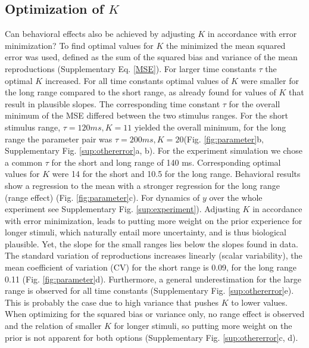 \documentclass[10pt]{article}
\begin{document}
\subsection{Optimization of $K$}
Can behavioral effects also be achieved by adjusting $K$ in accordance with error minimization?
To find optimal values for $K$ the minimized the mean squared error was used, defined as the sum of the squared bias and variance of the mean reproductions (Supplementary Eq. \ref{MSE}).
For larger time constants $\tau$ the optimal $K$ increased. For all time constants optimal values of $K$ were smaller for the long range compared to the short range, as already found for values of $K$ that result in plausible slopes.
The corresponding time constant $\tau$ for the overall minimum of the MSE differed between the two stimulus ranges. For the short stimulus range, $\tau = 120 ms, K= 11$ yielded the overall minimum, for the long range the parameter pair was $\tau = 200 ms, K= 20$(Fig. \ref{fig:parameter}b, Supplementary Fig. \ref{sup:othererror}a, b). 
For the experiment simulation we chose a common $\tau$ for the short and long range of 140 ms. Corresponding optimal values for $K$ were 14 for the short and 10.5 for the long range. 
Behavioral results show a regression to the mean with a stronger regression for the long range (range effect) (Fig. \ref{fig:parameter}c). For dynamics of $y$ over the whole experiment see Supplementary Fig. \ref{sup:experiment}).
Adjusting $K$ in accordance with error minimization, leads to putting more weight on the prior experience for longer stimuli, which naturally entail more uncertainty, and is thus biological plausible.
Yet, the slope for the small ranges lies below the slopes found in data. 
The standard variation of reproductions increases linearly (scalar variability), the mean coefficient of variation (CV) for the short range is 0.09, for the long range 0.11 (Fig. \ref{fig:parameter}d).
Furthermore, a general underestimation for the large range is observed for all time constants (Supplementary Fig. \ref{sup:othererror}e). This is probably the case due to high variance that pushes $K$ to lower values.
When optimizing for the squared bias or variance only, no range effect is observed and the relation of smaller $K$ for longer stimuli, so putting more weight on the prior is not apparent for both options (Supplementary Fig. \ref{sup:othererror}c, d).  
\end{document}
